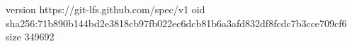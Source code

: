 version https://git-lfs.github.com/spec/v1
oid sha256:71b890b144bd2e3818cb97fb022ec6dcb81b6a3afd832df8fcdc7b3cce709cf6
size 349692
